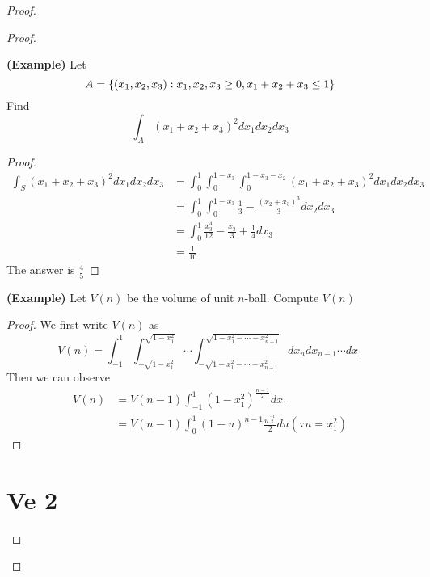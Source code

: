\documentclass{report}
\begin{document}
\begin{proof}
\begin{proof}
\begin{theorem}
\label{5.6.4}
\textbf{(Example)} Let 
\begin{equation}
A=\{ (x_1,x_2,x_3):x_1,x_2,x_3 \geq 0, x_1+x_2+x_3\leq 1 \}
\end{equation}
Find
\begin{equation}
\int_A (x_1+x_2+x_3)^2 dx_1dx_2dx_3
\end{equation}
\end{theorem}
\begin{proof}
\begin{align}
\int_S(x_1+x_2+x_3)^2dx_1dx_2dx_3&=\int_0^1 \int_0^{1-x_3}\int_0^{1-x_3-x_2}(x_1+x_2+x_3)^2dx_1dx_2dx_3\\
&=\int_0^1\int_0^{1-x_3}\frac{1}{3}-\frac{(x_2+x_3)^3}{3}dx_2dx_3\\
&=\int_0^1 \frac{x_3^4}{12}-\frac{x_3}{3}+\frac{1}{4}dx_3\\
&=\frac{1}{10}
\end{align}
The answer is $\frac{4}{5}$
\end{proof}
\begin{theorem}
\label{5.6.5}
\textbf{(Example)} Let $V(n)$ be the volume of unit $n$-ball. Compute $V(n)$
\end{theorem}
\begin{proof}
We first write $V(n)$ as
 \begin{equation}
V(n)=\int_{-1}^1\int_{-\sqrt{1-x_1^2}}^{\sqrt{1-x_1^2}}\cdots \int^{\sqrt{1-x_1^2-\cdots -x_{n-1}^2} }_{-\sqrt{1-x_1^2-\cdots -x_{n-1}^2} }dx_ndx_{n-1}\cdots dx_1
\end{equation}
Then we can observe
\begin{align}
  V(n)&=V(n-1)\int_{-1}^1 (1-x_1^2)^{\frac{n-1}{2}}dx_1\\
  &=V(n-1)\int_0^1 (1-u)^{n-1}\frac{u^{\frac{-1}{2}}}{2}du (\because u=x_1^2)
\end{align}
\end{proof}
\chapter{Ve 2}

\end{proof}
\end{proof}
\end{document}

